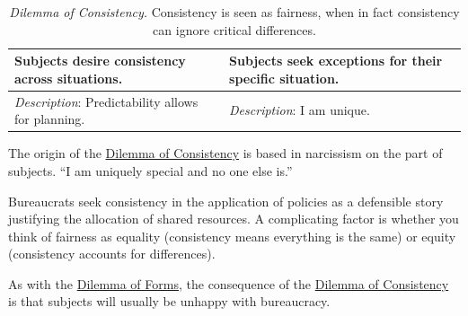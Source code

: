 \begin{center}
\begin{table}[H] %
\begin{tabular}{ | m{\dilemmatablewidth}| m{\dilemmatablewidth} | } 
  \hline
  \textbf{Subjects desire consistency across situations.} &
  \textbf{Subjects seek exceptions for their specific situation.} \\
  \hline
  \textit{Description}: Predictability allows for planning. & 
  \textit{Description}: I am unique. \\
  \hline
\end{tabular}
\caption{\textit{Dilemma of Consistency.}
Consistency is seen as fairness, when in fact consistency can ignore critical differences. %
}
\label{table:dilemma-consistency}
\end{table}
\end{center}

The origin of the \hyperref[table:dilemma-consistency]{Dilemma of Consistency} is based in narcissism on the part of subjects. ``I am uniquely special and no one else is.''  

Bureaucrats seek consistency in the application of policies as a defensible story justifying the allocation of shared resources. A complicating factor is whether you think of fairness as equality (consistency means everything is the same) or equity (consistency accounts for differences). 

As with the \hyperref[table:dilemma-forms]{Dilemma of Forms}, the consequence of the \hyperref[table:dilemma-consistency]{Dilemma of Consistency} is that subjects will usually be unhappy with bureaucracy. 

